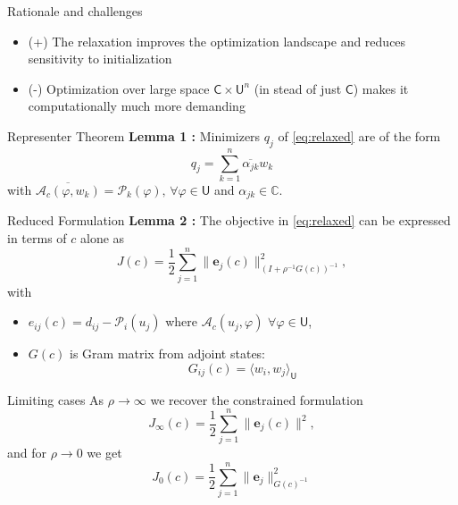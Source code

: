 \documentclass{beamer}
\newcommand{\sU}{\mathsf{U}}
\newcommand{\sC}{\mathsf{C}}
\newcommand{\mA}{\mathcal{A}}
\newcommand{\mP}{\mathcal{P}}
\begin{document}
\begin{frame}{Rationale and challenges}
\vspace{1cm}
\begin{itemize}
  \item (+) The relaxation improves the optimization landscape and reduces sensitivity to initialization
  \item (-) Optimization over large space $\sC \times \sU^n$ (in stead of just $\sC$) makes it computationally much more demanding
\end{itemize}
\end{frame}

\begin{frame}{Representer Theorem}
\textbf{Lemma 1 \cite{van2025analysis}:} Minimizers $q_j$ of \eqref{eq:relaxed} are of the form
\begin{equation*}
q_j = \sum_{k=1}^n \overline{\alpha_{jk}} w_k
\end{equation*}
with $\overline{\mA_c(\varphi, w_k)} = \mP_k(\varphi),\, \forall \varphi\in\sU$ and $\alpha_{jk}\in\mathbb{C}$.
\end{frame}

\begin{frame}{Reduced Formulation}
\textbf{Lemma 2 \cite{van2025analysis}:}
The objective in \eqref{eq:relaxed} can be expressed in terms of $c$ alone as 
\begin{equation*}
J(c) = \frac{1}{2} \sum_{j=1}^n \|\mathbf{e}_j(c)\|_{(I + \rho^{-1} G(c))^{-1}}^2,
\end{equation*}
with
\begin{itemize}
  \item $e_{ij}(c) = d_{ij}-\mP_i(u_j)$ where $\mA_c(u_j,\varphi)\,\, \forall \varphi\in\sU$,
  \item $G(c)$ is Gram matrix from adjoint states:
\begin{equation*}
G_{ij}(c) = \langle w_i, w_j \rangle_\sU
\end{equation*}
\end{itemize}
\end{frame}

\begin{frame}{Limiting cases}
As $\rho\rightarrow\infty$ we recover the constrained formulation
\begin{equation*}
J_\infty(c) = \frac{1}{2} \sum_{j=1}^n \|\mathbf{e}_j(c)\|^2,
\end{equation*}
and for $\rho\rightarrow 0$ we get
\begin{equation*}
J_0(c) = \frac{1}{2} \sum_{j=1}^n \|\mathbf{e}_j\|_{G(c)^{-1}}^2
\end{equation*}
\end{frame}
\end{document}
